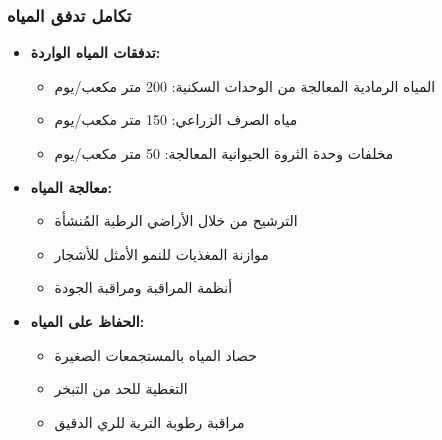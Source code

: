 \subsubsection{تكامل تدفق المياه}
\begin{itemize}
    \item \textbf{تدفقات المياه الواردة:}
    \begin{itemize}
        \item المياه الرمادية المعالجة من الوحدات السكنية: 200 متر مكعب/يوم
        \item مياه الصرف الزراعي: 150 متر مكعب/يوم
        \item مخلفات وحدة الثروة الحيوانية المعالجة: 50 متر مكعب/يوم
    \end{itemize}
    \item \textbf{معالجة المياه:}
    \begin{itemize}
        \item الترشيح من خلال الأراضي الرطبة المُنشأة
        \item موازنة المغذيات للنمو الأمثل للأشجار
        \item أنظمة المراقبة ومراقبة الجودة
    \end{itemize}
    \item \textbf{الحفاظ على المياه:}
    \begin{itemize}
        \item حصاد المياه بالمستجمعات الصغيرة
        \item التغطية للحد من التبخر
        \item مراقبة رطوبة التربة للري الدقيق
    \end{itemize}
\end{itemize}

